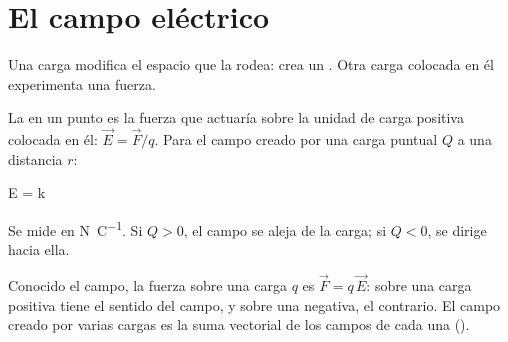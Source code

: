 \section{El campo eléctrico}\label{sec:ele-campo}

Una carga modifica el espacio que la rodea: crea un . Otra carga colocada en él experimenta una fuerza.

\begin{definition}
    La  en un punto es la fuerza que actuaría sobre la unidad de carga positiva colocada
    en él: \(\vec E = \vec F/q\). Para el campo creado por una carga puntual \(Q\) a una distancia \(r\):
    \begin{centeredequation}
         \qquad\qquad E = k\, \label{eq:ele-E}
    \end{centeredequation}
    Se mide en \unit{\newton\per\coulomb}. Si \(Q > 0\), el campo se aleja de la carga; si \(Q < 0\), se dirige hacia ella.
\end{definition}

Conocido el campo, la fuerza sobre una carga \(q\) es \(\vec F = q\,\vec E\): sobre una carga positiva tiene el sentido del
campo, y sobre una negativa, el contrario. El campo creado por varias cargas es la suma vectorial de los campos de cada una
().

